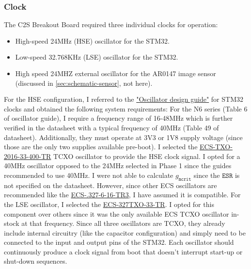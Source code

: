 \documentclass[10pt]{article}
\newcommand{\nl}{\newline \newline}
\begin{document}
\subsubsection{Clock}
The C2S Breakout Board required three individual clocks for operation:
\begin{itemize}[noitemsep]
    \item High-speed 24MHz (HSE) oscillator for the STM32.
    \item Low-speed 32.768KHz (LSE) oscillator for the STM32.
    \item High speed 24MHZ external oscillator for the AR0147 image sensor (discussed in \autoref{sec:schematic-sensor}, not here).
\end{itemize}
For the HSE configuration, I referred to the \href{https://www.st.com/resource/en/application_note/an2867-guidelines-for-oscillator-design-on-stm8afals-and-stm32-mcusmpus-stmicroelectronics.pdf}{"Oscillator design guide"} for STM32 clocks and obtained the following system requirements:
For the N6 series (Table 6 of oscillator guide), I require a frequency range of 16-48MHz which is further verified in the datasheet with a typical frequency of 40MHz (Table 49 of datasheet). Additionally, they must operate at 3V3 or 1V8 supply voltage (since those are the only two supplies available pre-boot).
\nl
I selected the \href{https://au.mouser.com/ProductDetail/ECS/ECS-TXO-2016-33-400-TR?qs=PzGy0jfpSMtctR53CPxRHg%3D%3D}{ECS-TXO-2016-33-400-TR} TCXO oscillator to provide the HSE clock signal. I opted for a 40MHz oscillator opposed to the 24MHz selected in Phase 1 since the guides recommended to use 40MHz.
I were not able to calculate $g_{\texttt{mcrit}}$ since the $\texttt{ESR}$ is not specified on the datasheet. However, since other ECS oscillators are recommended like the \href{https://au.mouser.com/datasheet/2/122/ECX_16-845175.pdf}{ECS-.327-6-16-TR3}, I have assumed it is compatible.
For the LSE oscillator, I selected the \href{https://au.mouser.com/datasheet/2/122/ECS_327TXO-1595920.pdf}{ECS-327TXO-33-TR}. I opted for this component over others since it was the only available ECS TCXO oscillator in-stock at that frequency.
\nl
Since all three oscillators are TCXO, they already include internal circuitry (like the capacitor configuration) and simply need to be connected to the input and output pins of the STM32.
\nl
Each oscillator should continuously produce a clock signal from boot that doesn't interrupt start-up or shut-down sequences.

\end{document}
